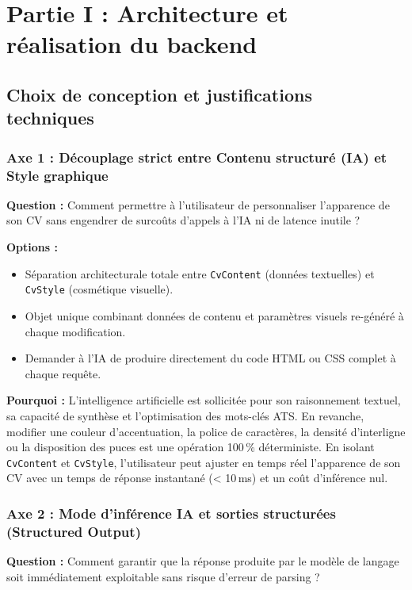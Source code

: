\documentclass[11pt,a4paper]{article}
\begin{document}
\newpage

\section{Partie I : Architecture et réalisation du backend}

\subsection{Choix de conception et justifications techniques}

\subsubsection{Axe 1 : Découplage strict entre Contenu structuré (IA) et Style graphique}
\textbf{Question :} Comment permettre à l'utilisateur de personnaliser l'apparence de son CV sans engendrer de surcoûts d'appels à l'IA ni de latence inutile ?

\textbf{Options :}
\begin{itemize}
    \item[$\boxtimes$] Séparation architecturale totale entre \texttt{CvContent} (données textuelles) et \texttt{CvStyle} (cosmétique visuelle).
    \item[$\square$] Objet unique combinant données de contenu et paramètres visuels re-généré à chaque modification.
    \item[$\square$] Demander à l'IA de produire directement du code HTML ou CSS complet à chaque requête.
\end{itemize}

\textbf{Pourquoi :} L'intelligence artificielle est sollicitée pour son raisonnement textuel, sa capacité de synthèse et l'optimisation des mots-clés ATS. En revanche, modifier une couleur d'accentuation, la police de caractères, la densité d'interligne ou la disposition des puces est une opération 100\,\% déterministe. En isolant \texttt{CvContent} et \texttt{CvStyle}, l'utilisateur peut ajuster en temps réel l'apparence de son CV avec un temps de réponse instantané (< 10\,ms) et un coût d'inférence nul.

\subsubsection{Axe 2 : Mode d'inférence IA et sorties structurées (Structured Output)}
\textbf{Question :} Comment garantir que la réponse produite par le modèle de langage soit immédiatement exploitable sans risque d'erreur de parsing ?
\end{document}
